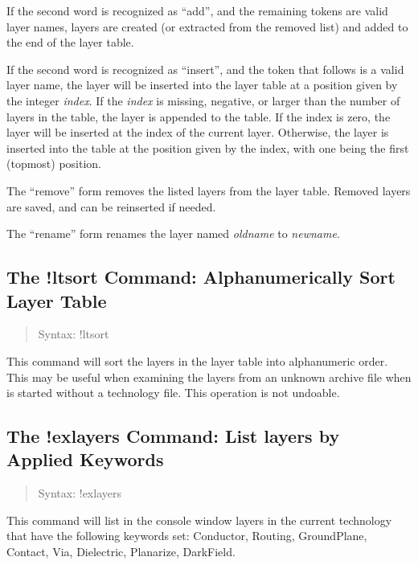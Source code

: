 If the second word is recognized as ``{\vt add}'', and the remaining
tokens are valid layer names, layers are created (or extracted from
the removed list) and added to the end of the layer table.

If the second word is recognized as ``{\vt insert}'', and the token
that follows is a valid layer name, the layer will be inserted into
the layer table at a position given by the integer {\it index}.  If
the {\it index} is missing, negative, or larger than the number of
layers in the table, the layer is appended to the table.  If the index
is zero, the layer will be inserted at the index of the current layer. 
Otherwise, the layer is inserted into the table at the position given
by the index, with one being the first (topmost) position.

The ``{\vt remove}'' form removes the listed layers from the layer
table.  Removed layers are saved, and can be reinserted if needed.

The ``{\vt rename}'' form renames the layer named {\it oldname}
to {\it newname}.

\subsection{The {\cb !ltsort} Command: Alphanumerically
 Sort Layer Table}
\begin{quote}
Syntax: {\vt !ltsort}
\end{quote}
This command will sort the layers in the layer table into alphanumeric
order.  This may be useful when examining the layers from an unknown
archive file when {\Xic} is started without a technology file.  This
operation is not undoable.

\subsection{The {\cb !exlayers} Command: List layers by Applied Keywords}
\begin{quote}
Syntax: {\vt !exlayers}
\end{quote}
This command will list in the console window layers in the current
technology that have the following keywords set:
{\vt Conductor}, {\vt Routing}, {\vt GroundPlane}, {\vt Contact},
{\vt Via}, {\vt Dielectric}, {\vt Planarize}, {\vt DarkField}.


